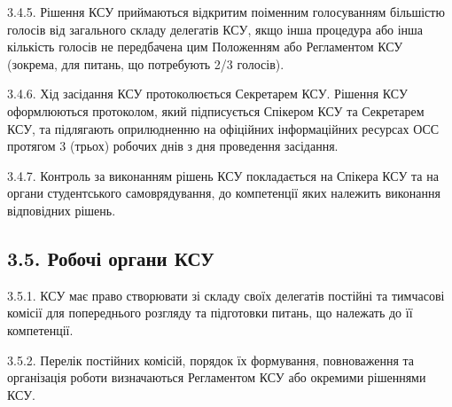    3.4.5. Рішення КСУ приймаються відкритим поіменним голосуванням більшістю голосів від загального складу делегатів КСУ, якщо інша процедура або інша кількість голосів не передбачена цим Положенням або Регламентом КСУ (зокрема, для питань, що потребують 2/3 голосів).

    3.4.6. Хід засідання КСУ протоколюється Секретарем КСУ. Рішення КСУ оформлюються протоколом, який підписується Спікером КСУ та Секретарем КСУ, та підлягають оприлюдненню на офіційних інформаційних ресурсах ОСС протягом 3 (трьох) робочих днів з дня проведення засідання.

    3.4.7. Контроль за виконанням рішень КСУ покладається на Спікера КСУ та на органи студентського самоврядування, до компетенції яких належить виконання відповідних рішень.

\subsection*{3.5. Робочі органи КСУ}
    3.5.1. КСУ має право створювати зі складу своїх делегатів постійні та тимчасові комісії для попереднього розгляду та підготовки питань, що належать до її компетенції.

    3.5.2. Перелік постійних комісій, порядок їх формування, повноваження та організація роботи визначаються Регламентом КСУ або окремими рішеннями КСУ.